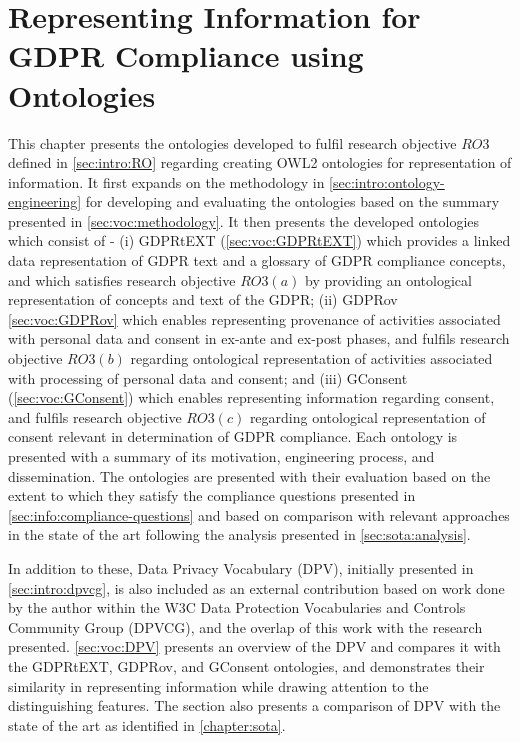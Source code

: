 \chapter{Representing Information for GDPR Compliance using Ontologies}
\label{chapter:vocabularies}

This chapter presents the ontologies developed to fulfil research objective $RO3$ defined in \autoref{sec:intro:RO} regarding creating OWL2 ontologies for representation of information.
It first expands on the methodology in \autoref{sec:intro:ontology-engineering} for developing and evaluating the ontologies based on the summary presented in \autoref{sec:voc:methodology}.
It then presents the developed ontologies which consist of - (i) GDPRtEXT (\autoref{sec:voc:GDPRtEXT}) which provides a linked data representation of GDPR text and a glossary of GDPR compliance concepts, and which satisfies research objective $RO3(a)$ by providing an ontological representation of concepts and text of the GDPR; (ii) GDPRov \autoref{sec:voc:GDPRov} which enables representing provenance of activities associated with personal data and consent in ex-ante and ex-post phases, and fulfils research objective $RO3(b)$ regarding ontological representation of activities associated with processing of personal data and consent; and (iii) GConsent (\autoref{sec:voc:GConsent}) which enables representing information regarding consent, and fulfils research objective $RO3(c)$ regarding ontological representation of consent relevant in determination of GDPR compliance.
Each ontology is presented with a summary of its motivation, engineering process, and dissemination. The ontologies are presented with their evaluation based on the extent to which they satisfy the compliance questions presented in \autoref{sec:info:compliance-questions} and based on comparison with relevant approaches in the state of the art following the analysis presented in \autoref{sec:sota:analysis}.

In addition to these, Data Privacy Vocabulary (DPV), initially presented in \autoref{sec:intro:dpvcg}, is also included as an external contribution based on work done by the author within the W3C Data Protection Vocabularies and Controls Community Group (DPVCG), and the overlap of this work with the research presented. \autoref{sec:voc:DPV} presents an overview of the DPV and compares it with the GDPRtEXT, GDPRov, and GConsent ontologies, and demonstrates their similarity in representing information while drawing attention to the distinguishing features.
The section also presents a comparison of DPV with the state of the art as identified in \autoref{chapter:sota}.

